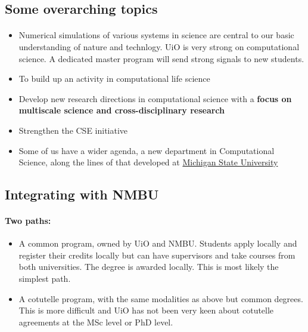 \documentclass[%
oneside,                 %
final,                   %
10pt]{article}
\begin{document}
\noindent



\subsection*{Some overarching topics}

\paragraph{}
\begin{itemize}
\item Numerical simulations of various systems in science are central to our basic understanding of nature and technlogy. UiO is very strong on computational science. A dedicated master program will send strong signals to new students.

\item To build up an activity in computational life science

\item Develop new research directions in computational science with a \textbf{focus on multiscale science and cross-disciplinary research}

\item Strengthen the CSE initiative

\item Some of us have a wider agenda, a new department in Computational Science, along the lines of that developed at \href{{http://msutoday.msu.edu/news/2015/new-department-advances-computational-science-research-education/}}{Michigan State University}
\end{itemize}

\noindent





\subsection*{Integrating with NMBU}

\paragraph{Two paths:}

\begin{itemize}
\item A common program, owned by UiO and NMBU. Students apply locally and register their credits locally but can have supervisors and take courses from both universities. The degree is awarded locally. This is most likely the simplest path. 

\item A cotutelle program, with the same modalities as above but common degrees. This is more difficult and UiO has not been very keen about cotutelle agreements at the MSc level or PhD level.  
\end{itemize}
\end{document}
